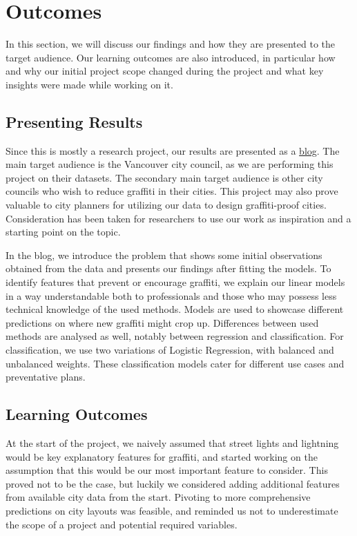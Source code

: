 \chapter{Outcomes}
In this section, we will discuss our findings and how they are presented to the target audience. Our learning outcomes are also introduced, in particular how and why our initial project scope changed during the project and what key insights were made while working on it.

\section{Presenting Results}

Since this is mostly a research project, our results are presented as a \href{https://cowkeyman.github.io/PredictingGraffitiUsingCityLayouts/}{blog}. The main target audience is the Vancouver city council, as we are performing this project on their datasets. The secondary main target audience is other city councils who wish to reduce graffiti in their cities. This project may also prove valuable to city planners for utilizing our data to design graffiti-proof cities. Consideration has been taken for researchers to use our work as inspiration and a starting point on the topic.

In the blog, we introduce the problem that shows some initial observations obtained from the data and presents our findings after fitting the models. To identify features that prevent or encourage graffiti, we explain our linear models in a way understandable both to professionals and those who may possess less technical knowledge of the used methods. Models are used to showcase different predictions on where new graffiti might crop up. Differences between used methods are analysed as well, notably between regression and classification. For classification, we use two variations of Logistic Regression, with balanced and unbalanced weights. These classification models cater for different use cases and preventative plans.

\section{Learning Outcomes} %
At the start of the project, we naively assumed that street lights and lightning would be key explanatory features for graffiti, and started working on the assumption that this would be our most important feature to consider. This proved not to be the case, but luckily we considered adding additional features from available city data from the start. Pivoting to more comprehensive predictions on city layouts was feasible, and reminded us not to underestimate the scope of a project and potential required variables.

